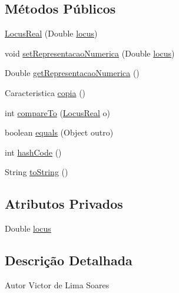 \subsection*{Métodos Públicos}
\begin{DoxyCompactItemize}
\item 
\hyperlink{classic_1_1populacional_1_1seres_1_1reais_1_1_locus_real_ae9c9a3cee63ea25176533593e792ce48}{Locus\-Real} (Double \hyperlink{classic_1_1populacional_1_1seres_1_1reais_1_1_locus_real_ab9bbb0e0be3c34b0d7c9249cfc07e377}{locus})
\item 
void \hyperlink{classic_1_1populacional_1_1seres_1_1reais_1_1_locus_real_af38534fbb68bb4e9970f74e505a55d04}{set\-Representacao\-Numerica} (Double \hyperlink{classic_1_1populacional_1_1seres_1_1reais_1_1_locus_real_ab9bbb0e0be3c34b0d7c9249cfc07e377}{locus})
\item 
Double \hyperlink{classic_1_1populacional_1_1seres_1_1reais_1_1_locus_real_a255056872ede5cd634bf87c244a1df19}{get\-Representacao\-Numerica} ()
\item 
Caracteristica \hyperlink{classic_1_1populacional_1_1seres_1_1reais_1_1_locus_real_ae92c0a2f11eef616f08d958a6a58156a}{copia} ()
\item 
int \hyperlink{classic_1_1populacional_1_1seres_1_1reais_1_1_locus_real_af6150465c5ceb87ddb85ccdc85cf0f07}{compare\-To} (\hyperlink{classic_1_1populacional_1_1seres_1_1reais_1_1_locus_real}{Locus\-Real} o)
\item 
boolean \hyperlink{classic_1_1populacional_1_1seres_1_1reais_1_1_locus_real_adef2cb8b1666acb1ca4996a9e322f9e0}{equals} (Object outro)
\item 
int \hyperlink{classic_1_1populacional_1_1seres_1_1reais_1_1_locus_real_a7a9e174b09343b5b4cfc78ca69038ae5}{hash\-Code} ()
\item 
String \hyperlink{classic_1_1populacional_1_1seres_1_1reais_1_1_locus_real_aecf0b483791ecc5a9ecb5f0442e3d18e}{to\-String} ()
\end{DoxyCompactItemize}
\subsection*{Atributos Privados}
\begin{DoxyCompactItemize}
\item 
Double \hyperlink{classic_1_1populacional_1_1seres_1_1reais_1_1_locus_real_ab9bbb0e0be3c34b0d7c9249cfc07e377}{locus}
\end{DoxyCompactItemize}


\subsection{Descrição Detalhada}
\begin{DoxyAuthor}{Autor}
Victor de Lima Soares 
\end{DoxyAuthor}


